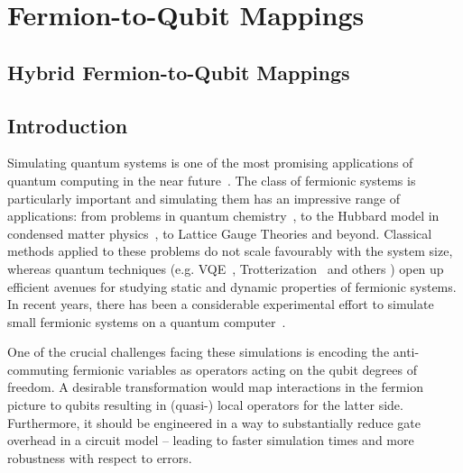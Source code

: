 
\chapter{Fermion-to-Qubit Mappings}

\ifpdf
    \graphicspath{{Chapter2/Figs/Raster/}{Chapter2/Figs/PDF/}{Chapter2/Figs/}{Chapter2/}}
\else
    \graphicspath{{Chapter2/Figs/Vector/}{Chapter2/Figs/}{Chapter2/}}
\fi


\section[Hybrid Mappings]{Hybrid Fermion-to-Qubit Mappings}

\section{Introduction}
Simulating quantum systems is one of the most promising applications of quantum computing in the near future~\cite{feynman2018simulating,lloyd1996universal,ortiz2002simulating}. The class of fermionic systems is particularly important and simulating them has an impressive range of applications: from problems in quantum chemistry~\cite{mcardle2020quantum,reiher2017elucidating}, to the Hubbard model in condensed matter physics~\cite{abrams1997simulation}, to Lattice Gauge Theories \cite{banuls2020simulating,chakraborty2022classically} and beyond. Classical methods applied to these problems do not scale favourably with the system size, whereas quantum techniques (e.g. VQE~\cite{mcclean2016theory}, Trotterization~\cite{tranter2019ordering} and others \cite{bravyi2002fermionic,friesner2005ab,ortiz2001quantum}) open up efficient avenues for studying static and dynamic properties of fermionic systems. In recent years, there has been a considerable experimental effort to simulate small fermionic systems on a quantum computer~\cite{barends2015digital,kokail2019self}.

 One of the crucial challenges facing these simulations is encoding the anti-commuting fermionic variables as operators acting on the qubit degrees of freedom. A desirable transformation would map interactions in the fermion picture to qubits resulting in (quasi-) local operators for the latter side. Furthermore, it should be engineered in a way to substantially reduce gate overhead in a circuit model -- leading to faster simulation times and more robustness with respect to errors.

